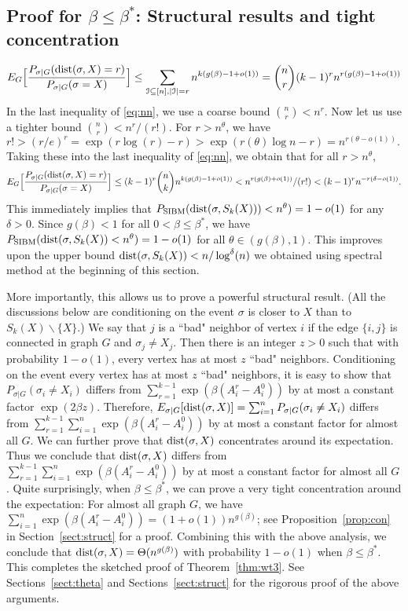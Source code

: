 \documentclass{article}
\begin{document}
\subsection{Proof for $\beta\le\beta^\ast$: Structural results and tight concentration}
\begin{equation} \label{eq:nn}
E_G \Big[ \frac{P_{\sigma|G} ( \operatorname{dist}(\sigma, X) = r)}{P_{\sigma|G}(\sigma= X)} \Big]
\le \sum_{\mathcal{I}\subseteq[n],|\mathcal{I}|=r} 
n^{k (g(\beta)-1+o(1))}
= \binom{n}{r} (k-1)^r n^{r (g(\beta)-1+o(1))}
\end{equation}
In the last inequality of \eqref{eq:nn}, we use a coarse bound $\binom{n}{r}<n^r$. Now let us use a tighter bound $\binom{n}{r}<n^r/(r!)$. 
For $r>n^{\theta}$, we have
$
r!>(r/e)^r
=\exp(r\log(r)-r)
>\exp(r(\theta)\log n-r)
=n^{r(\theta-o(1))} .
$
Taking these into the last inequality of \eqref{eq:nn}, we obtain that for all $r>n^{\theta}$,
$$
E_G \Big[ \frac{P_{\sigma|G} ( \operatorname{dist}(\sigma, X) = r )}{P_{\sigma|G}(\sigma= X)} \Big]
\le  (k-1)^r\binom{n}{k} n^{k (g(\beta)-1+o(1))}
< n^{r (g(\beta)+o(1))} /(r!) 
< (k-1)^rn^{-r(\delta-o(1))} .
$$
This immediately implies that  $P_{\operatorname{SIBM}} (\operatorname{dist}(\sigma, S_k(X)))<n^{\theta} ) = 1- o(1)$ for any $\delta>0$.
Since $g(\beta)<1$ for all $0<\beta\le\beta^\ast$,
we have $P_{\operatorname{SIBM}} (\operatorname{dist}(\sigma, S_k(X))<n^{\theta} ) = 1- o(1)$ for all $\theta\in (g(\beta), 1)$.
This improves upon the upper bound 
$\operatorname{dist}(\sigma, S_k(X))< n/\log^{\delta}(n)$ we obtained using spectral method at the beginning of this section.

More importantly, this allows us to prove a powerful structural result. (All the discussions below are conditioning on the event $\sigma$ is closer to $X$ than to $S_k(X)\backslash\{X\}$.) We say that $j$ is a ``bad" neighbor of vertex $i$ if the edge $\{i,j\}$ is connected in graph $G$ and $\sigma_j\neq X_j$. Then there is an integer $z>0$ such that with probability $1-o(1)$, every vertex has at most $z$ ``bad" neighbors.
Conditioning on the event every vertex has at most $z$ ``bad" neighbors, it is easy to show that $P_{\sigma|G}(\sigma_i \neq X_i)$ differs from $\sum_{r=1}^{k-1}\exp (\beta (A^r_i-A^0_i))$ by at most a constant factor $\exp(2\beta z)$.
Therefore, $E_{\sigma|G}[\operatorname{dist}(\sigma,X)]=\sum_{i=1}^n P_{\sigma|G}(\sigma_i \neq X_i)$ differs from $\sum_{r=1}^{k-1} \sum_{i=1}^n\exp (\beta (A^r_i-A^0_i))$ by at most a constant factor for almost all $G$.
We can further prove that $\operatorname{dist}(\sigma,X)$ concentrates around its expectation. Thus we conclude that $\operatorname{dist}(\sigma,X)$ differs from $\sum_{r=1}^{k-1} \sum_{i=1}^n\exp (\beta (A^r_i-A^0_i))$ by at most a constant factor for almost all $G$.
Quite surprisingly, when $\beta\le\beta^\ast$, we can prove a very tight concentration around the expectation: For almost all graph $G$, we have $\sum_{i=1}^n\exp (\beta (A^r_i-A^0_i))=(1+o(1))n^{g(\beta)}$; see Proposition~\ref{prop:con} in Section~\ref{sect:struct} for a proof. Combining this with the above analysis, we conclude that $\operatorname{dist}(\sigma,X)=\Theta(n^{g(\beta)})$ with probability $1-o(1)$ when $\beta\le\beta^\ast$. This completes the sketched proof of Theorem~\ref{thm:wt3}.
See Sections~\ref{sect:theta} and Sections~\ref{sect:struct} for the rigorous proof of the above arguments.
\end{document}
